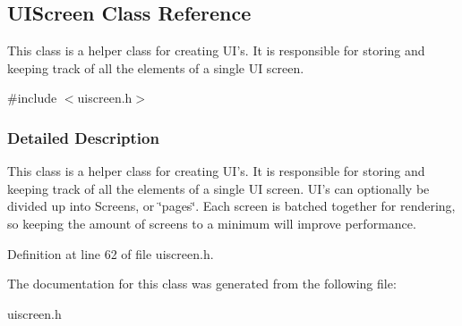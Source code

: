 \hypertarget{classUIScreen}{
\subsection{UIScreen Class Reference}
\label{d7/de3/classUIScreen}
}


This class is a helper class for creating UI's. It is responsible for storing and keeping track of all the elements of a single UI screen.  




{\ttfamily \#include $<$uiscreen.h$>$}



\subsubsection{Detailed Description}
This class is a helper class for creating UI's. It is responsible for storing and keeping track of all the elements of a single UI screen. UI's can optionally be divided up into Screens, or \char`\"{}pages\char`\"{}. Each screen is batched together for rendering, so keeping the amount of screens to a minimum will improve performance. 

Definition at line 62 of file uiscreen.h.



The documentation for this class was generated from the following file:\begin{DoxyCompactItemize}
\item 
uiscreen.h\end{DoxyCompactItemize}
